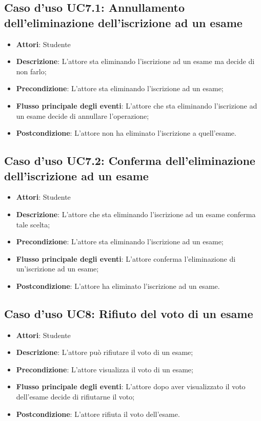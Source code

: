 \subsection{Caso d'uso \texorpdfstring{UC7.1}{UC7.1}: Annullamento dell'eliminazione dell'iscrizione ad un esame}
\begin{itemize}
\item \textbf{Attori}: Studente
\item \textbf{Descrizione}: L'attore sta eliminando l'iscrizione ad un esame ma decide di non farlo;
\item \textbf{Precondizione}: L'attore sta eliminando l'iscrizione ad un esame;
\item \textbf{Flusso principale degli eventi}: L'attore che sta eliminando l'iscrizione ad un esame decide di annullare l'operazione;
\item \textbf{Postcondizione}: L'attore non ha eliminato l'iscrizione a quell'esame.
\end{itemize}
\subsection{Caso d'uso \texorpdfstring{UC7.2}{UC7.2}: Conferma dell'eliminazione dell'iscrizione ad un esame}
\begin{itemize}
\item \textbf{Attori}: Studente
\item \textbf{Descrizione}: L'attore che sta eliminando l'iscrizione ad un esame conferma tale scelta;
\item \textbf{Precondizione}: L'attore sta eliminando l'iscrizione ad un esame;
\item \textbf{Flusso principale degli eventi}: L'attore conferma l'eliminazione di un'iscrizione ad un esame;
\item \textbf{Postcondizione}: L'attore ha eliminato l'iscrizione ad un esame.
\end{itemize}
\subsection{Caso d'uso \texorpdfstring{UC8}{UC8}: Rifiuto del voto di un esame}
\begin{itemize}
\item \textbf{Attori}: Studente
\item \textbf{Descrizione}: L'attore può rifiutare il voto di un esame;
\item \textbf{Precondizione}: L'attore visualizza il voto di un esame;
\item \textbf{Flusso principale degli eventi}: L'attore dopo aver visualizzato il voto dell'esame decide di rifiutarne il voto;
\item \textbf{Postcondizione}: L'attore rifiuta il voto dell'esame.
\end{itemize}
